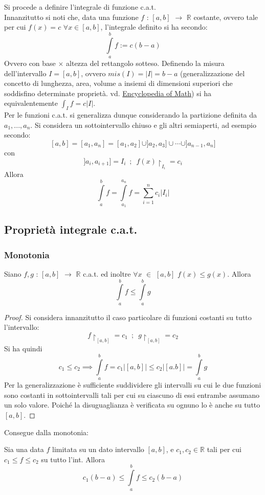 \documentclass[10pt, oneside]{book}
\theoremstyle{plain}
\begin{document}
Si procede a definire l'integrale di funzione c.a.t.
\\Innanzitutto si noti che, data una funzione $f$ : $[a,b]$ $\rightarrow$ $\mathbb{R}$ costante, ovvero tale per cui $f(x) = c$ $\forall x \in [a,b]$, l'integrale definito si ha secondo:
\[\int \limits_a^b f := c (b - a)\]
Ovvero con base $\times$ altezza del rettangolo sotteso. Definendo la misura dell'intervallo $I = [a,b]$, ovvero $mis(I) = \big|I\big| = b - a$ (generalizzazione del concetto di lunghezza, area, volume a insiemi di dimensioni superiori che soddisfino determinate proprietà. vd. \href{https://encyclopediaofmath.org/wiki/Measure#Jordan.2C_Lebesgue_and_Lebesgue.E2.80.93Stieltjes_measures.}{Encyclopedia of Math}) si ha equivalentemente $\int_I f = c \big|I\big|$.
\\Per le funzioni c.a.t. si generalizza dunque considerando la partizione definita da $a_1, ..., a_n$. Si considera un sottointervallo chiuso e gli altri semiaperti, ad esempio secondo:
\[[a, b] = [a_1, a_n] = [a_1, a_2] \cup ]a_2, a_3] \cup \cdots \cup ]a_{n-1}, a_n]\]
con 
\[]a_i, a_{i+1}] = I_i \enspace; \enspace f(x)\restriction_{I_i} = c_i\]
Allora
\[\int\limits_{a}^{b} f = \int \limits_{a_1}^{a_n} f = \sum \limits_{i = 1}^n c_i \big|I_i\big|\]

\subsection{Proprietà integrale c.a.t.}
\subsubsection{Monotonia}
Siano $f,g$ : $[a,b]$ $\rightarrow$ $\mathbb{R}$ c.a.t. ed inoltre $\forall x$ $\in$ $[a,b]$ $f(x) \leq g(x)$. Allora
\[\int\limits_{a}^{b} f \leq \int\limits_{a}^{b} g\]
\begin{proof}
    Si considera innanzitutto il caso particolare di funzioni costanti su tutto l'intervallo:
    \[f \restriction_{[a,b]} = c_1 \enspace ; \enspace g \restriction_{[a,b]} = c_2\]
    Si ha quindi
    \[c_1 \leq c_2 \implies \int\limits_{a}^{b} f = c_1|[a,b]| \leq c_2|[a.b]| = \int\limits_{a}^{b} g\]
    Per la generalizzazione è sufficiente suddividere gli intervalli su cui le due funzioni sono costanti in sottointervalli tali per cui su ciascuno di essi entrambe assumano un solo valore. Poiché la disuguaglianza è verificata su ognuno lo è anche su tutto $[a,b]$.
\end{proof}
Consegue dalla monotonia:
\begin{oss}
    Sia una data $f$ limitata su un dato intervallo $[a,b]$, e $c_1, c_2 \in \mathbb{R}$ tali per cui $c_1 \leq f \leq c_2$ su tutto l'int. Allora
    \[c_1(b - a) \leq \int\limits_{a}^{b} f \leq c_2(b-a)\]
\end{oss}
\end{document}
